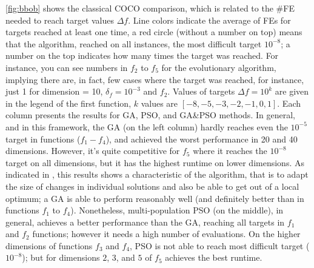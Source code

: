 \documentclass[runningheads]{llncs}
\begin{document}
\autoref{fig:bbob} shows the classical COCO comparison, which is
related to the \#FE needed to reach target values
$\Delta f$. Line colors indicate the average of FEs for targets reached
at least one time, a red circle (without a number on top) means that the algorithm,
reached on all instances, the most difficult target $10^{-8}$;
a number on the top indicates how many times the target was
reached. For instance, you can see numbers in $f_2$ to $f_5$ for the
evolutionary algorithm, implying there are, in fact, few cases where
the target was reached, for instance, just 1 for dimension = 10,
$\delta_f = 10^{-3}$ and $f_2$. Values of targets $\Delta f = 10^{k}$ are
given in the legend of the first function, $k$ values are $[-8,-5,-3,-2,-1,0,1]$.
Each column presents the results for GA, PSO, and GA\&PSO methods.
In general, and in this framework, the GA (on the left column) hardly reaches even the
$10^{-5}$ target in functions ($f_1-f_4$), and achieved the worst
performance in 20 and 40 dimensions. However, it's quite competitive for $f_5$
where it reaches the $10^{-8}$ target on all dimensions, but it has the highest runtime on lower
dimensions. As indicated in \cite{hansen2009real}, this results shows
a characteristic of the algorithm, that is to adapt the size of changes in
individual solutions and also be
able to get out of a local optimum; a GA is able to perform reasonably
well (and definitely better than in functions $f_1$ to $f_4$).
Nonetheless, multi-population PSO (on the middle),
in general, achieves a better performance than the GA, reaching all targets in
$f_1$ and $f_2$ functions; however it needs a high number of evaluations.
On the higher dimensions of functions $f_3$ and $f_4$, PSO is not able to reach most difficult target ($10^{-8}$); 
but for dimensions $2$, $3$, and $5$ of $f_5$ achieves the best runtime.
\end{document}
